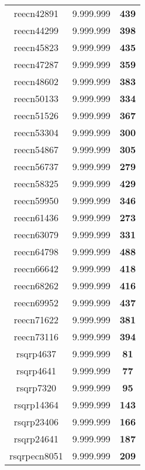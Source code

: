 \begin{tabular}{cc||c}
reecn42891       & 9.999.999        & {\bf 439}       \\ 
reecn44299       & 9.999.999        & {\bf 398}       \\ 
reecn45823       & 9.999.999        & {\bf 435}       \\ 
reecn47287       & 9.999.999        & {\bf 359}       \\ 
reecn48602       & 9.999.999        & {\bf 383}       \\ 
reecn50133       & 9.999.999        & {\bf 334}       \\ 
reecn51526       & 9.999.999        & {\bf 367}       \\ 
reecn53304       & 9.999.999        & {\bf 300}       \\ 
reecn54867       & 9.999.999        & {\bf 305}       \\ 
reecn56737       & 9.999.999        & {\bf 279}       \\ 
reecn58325       & 9.999.999        & {\bf 429}       \\ 
reecn59950       & 9.999.999        & {\bf 346}       \\ 
reecn61436       & 9.999.999        & {\bf 273}       \\ 
reecn63079       & 9.999.999        & {\bf 331}       \\ 
reecn64798       & 9.999.999        & {\bf 488}       \\ 
reecn66642       & 9.999.999        & {\bf 418}       \\ 
reecn68262       & 9.999.999        & {\bf 416}       \\ 
reecn69952       & 9.999.999        & {\bf 437}       \\ 
reecn71622       & 9.999.999        & {\bf 381}       \\ 
reecn73116       & 9.999.999        & {\bf 394}       \\ 
rsqrp4637        & 9.999.999        & {\bf 81}        \\ 
rsqrp4641        & 9.999.999        & {\bf 77}        \\ 
rsqrp7320        & 9.999.999        & {\bf 95}        \\ 
rsqrp14364       & 9.999.999        & {\bf 143}       \\ 
rsqrp23406       & 9.999.999        & {\bf 166}       \\ 
rsqrp24641       & 9.999.999        & {\bf 187}       \\ 
rsqrpecn8051     & 9.999.999        & {\bf 209}       \\ 

\end{tabular}
